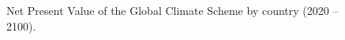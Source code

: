 \documentclass[12pt,english]{article}
\begin{document}
\begin{figure}[b!]
  \caption{Net Present Value of the Global Climate Scheme by country (2020 -- 2100).}\label{fig:median_gain_adj}
\end{figure}
\end{document}
